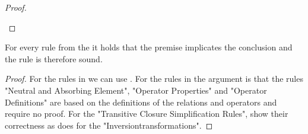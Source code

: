 \documentclass[a4paper,twoside,12pt, english]{article}
\begin{document}
\begin{proof}
\begin{itemize}
\end{itemize}
\end{proof}
\pagebreak
\begin{lemma}\label{lem:rulessoundness}
For every rule from the  it holds that the premise implicates the conclusion and the rule is therefore sound.
\end{lemma}
\begin{proof}
For the rules in  we can use . For the rules in  the argument is that the rules "Neutral and Absorbing Element", "Operator Properties" and "Operator Definitions" are based on the definitions of the relations and operators and require no proof. For the "Transitive Closure Simplification Rules",  show their correctness as does  for the "Inversiontransformations".
\end{proof}
\end{document}
